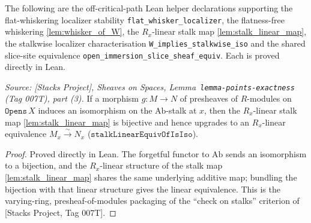 The following are the off-critical-path Lean helper declarations supporting the
flat-whiskering localizer stability \texttt{flat\_whisker\_localizer}, the
flatness-free whiskering \cref{lem:whisker_of_W}, the \(R_x\)-linear stalk map
\cref{lem:stalk_linear_map}, the stalkwise localizer characterisation
\texttt{W\_implies\_stalkwise\_iso} and the shared slice-site equivalence
\texttt{open\_immersion\_slice\_sheaf\_equiv}. Each is proved directly in Lean.

\begin{lemma}
  \label{lem:iso_iff_stalk_bijective}
  \textit{Source: [Stacks Project], Sheaves on Spaces, Lemma~\texttt{lemma-points-exactness}
  (Tag 007T), part (3).}
  If a morphism \(g\colon M \to N\) of presheaves of \(R\)-modules on
  \(\mathtt{Opens}\,X\) induces an isomorphism on the \(\mathrm{Ab}\)-stalk at \(x\),
  then the \(R_x\)-linear stalk map \cref{lem:stalk_linear_map} is bijective and hence
  upgrades to an \(R_x\)-linear equivalence \(M_x \xrightarrow{\sim} N_x\)
  (\(\mathtt{stalkLinearEquivOfIsIso}\)).
\end{lemma}
\begin{proof}
  Proved directly in Lean. The forgetful functor to \(\mathrm{Ab}\) sends an isomorphism
  to a bijection, and the \(R_x\)-linear structure of the stalk map
  \cref{lem:stalk_linear_map} shares the same underlying additive map; bundling the
  bijection with that linear structure gives the linear equivalence. This is the
  varying-ring, presheaf-of-modules packaging of the ``check on stalks'' criterion of
  [Stacks Project, Tag 007T].
\end{proof}

